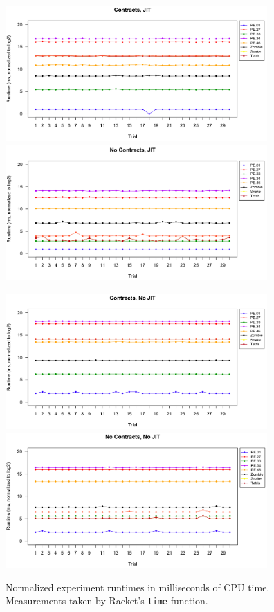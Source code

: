 \begin{figure}[t]
  \begin{center}
  \vspace*{-2cm}\hspace*{-3.5cm}\includegraphics[width=10cm]{data/contracts-jit-runtime.png}\includegraphics[width=10cm]{data/nocontracts-jit-runtime.png}

  \vspace{1cm}\hspace*{-3.5cm}\includegraphics[width=10cm]{data/contracts-nojit-runtime.png}\includegraphics[width=10cm]{data/nocontracts-nojit-runtime.png}
  
  \caption{Normalized experiment runtimes in milliseconds of CPU time. ~~~~ Measurements taken by Racket's \texttt{time} function.}
  \label{fig:runtimes}
  \end{center}
\end{figure}